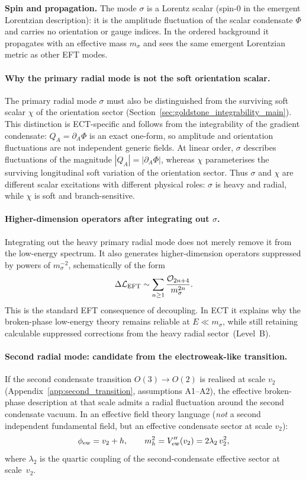 \documentclass[11pt,a4paper]{article}
\numberwithin{equation}{section}
\begin{document}
\textbf{Spin and propagation.}
The mode $\sigma$ is a Lorentz scalar (spin-0 in the emergent Lorentzian
description): it is the amplitude fluctuation of the scalar condensate
$\Phi$ and carries no orientation or gauge indices.
In the ordered background it propagates with an effective mass $m_\sigma$
and sees the same emergent Lorentzian metric as other EFT modes.

\paragraph{Why the primary radial mode is not the soft orientation scalar.}
The primary radial mode $\sigma$ must also be distinguished from the
surviving soft scalar $\chi$ of the orientation sector
(Section~\ref{sec:goldstone_integrability_main}).
This distinction is ECT-specific and follows from the integrability of
the gradient condensate: $Q_A=\partial_A\Phi$ is an exact one-form,
so amplitude and orientation fluctuations are not independent generic fields.
At linear order, $\sigma$ describes fluctuations of the magnitude
$|Q_A|=|\partial_A\Phi|$,
whereas $\chi$ parameterises the surviving longitudinal soft variation
of the orientation sector.
Thus $\sigma$ and $\chi$ are different scalar excitations with different
physical roles: $\sigma$ is heavy and radial, while $\chi$ is soft and
branch-sensitive.

\paragraph{Higher-dimension operators after integrating out $\sigma$.}
Integrating out the heavy primary radial mode does not merely remove it
from the low-energy spectrum.
It also generates higher-dimension operators suppressed by powers of
$m_\sigma^{-2}$, schematically of the form
\begin{equation}
  \Delta\mathcal{L}_{\rm EFT}
  \sim \sum_{n\ge 1}\frac{\mathcal{O}_{2n+4}}{m_\sigma^{2n}}.
  \label{eq:HDO_sigma}
\end{equation}
This is the standard EFT consequence of decoupling.
In ECT it explains why the broken-phase low-energy theory remains
reliable at $E\ll m_\sigma$, while still retaining calculable
suppressed corrections from the heavy radial sector~(Level~B).

\paragraph{Second radial mode: candidate from the electroweak-like transition.}
If the second condensate transition $O(3)\to O(2)$ is realised at
scale $v_2$ (Appendix~\ref{app:second_transition}, assumptions A1--A2),
the effective broken-phase description at that scale admits a radial
fluctuation around the second condensate vacuum.
In an effective field theory language (\emph{not} a second independent
fundamental field, but an effective condensate sector at scale $v_2$):
\begin{equation}
  \phi_{\rm ew} = v_2 + h, \qquad
  m_h^2 = V_{\rm ew}''(v_2) = 2\lambda_2\,v_2^2,
  \label{eq:higgs_mass_candidate}
\end{equation}
where $\lambda_2$ is the quartic coupling of the second-condensate
effective sector at scale~$v_2$.
\end{document}

